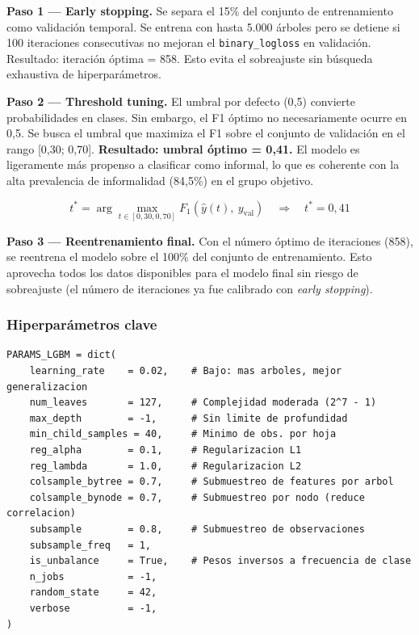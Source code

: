 \documentclass[12pt, a4paper]{article}
\begin{document}
\textbf{Paso 1 — Early stopping.} Se separa el 15\% del conjunto de entrenamiento como
validación temporal. Se entrena con hasta 5.000 árboles pero se detiene si 100 iteraciones
consecutivas no mejoran el \texttt{binary\_logloss} en validación. Resultado: iteración
óptima = 858. Esto evita el sobreajuste sin búsqueda exhaustiva de hiperparámetros.

\textbf{Paso 2 — Threshold tuning.} El umbral por defecto (0{,}5) convierte probabilidades
en clases. Sin embargo, el F1 óptimo no necesariamente ocurre en 0{,}5. Se busca el umbral
que maximiza el F1 sobre el conjunto de validación en el rango [0{,}30; 0{,}70].
\textbf{Resultado: umbral óptimo = 0{,}41.} El modelo es ligeramente más propenso a
clasificar como informal, lo que es coherente con la alta prevalencia de informalidad
(84{,}5\%) en el grupo objetivo.

\begin{equation}
  t^* = \arg\max_{t \in [0{,}30, 0{,}70]}
        F_1\!\left(\hat{y}(t),\ y_\text{val}\right)
  \quad \Rightarrow \quad t^* = 0{,}41
\end{equation}

\textbf{Paso 3 — Reentrenamiento final.} Con el número óptimo de iteraciones (858),
se reentrena el modelo sobre el 100\% del conjunto de entrenamiento. Esto aprovecha
todos los datos disponibles para el modelo final sin riesgo de sobreajuste (el número
de iteraciones ya fue calibrado con \textit{early stopping}).

\subsubsection{Hiperparámetros clave}

\begin{lstlisting}[caption={Hiperparámetros LightGBM campeón}]
PARAMS_LGBM = dict(
    learning_rate    = 0.02,    # Bajo: mas arboles, mejor generalizacion
    num_leaves       = 127,     # Complejidad moderada (2^7 - 1)
    max_depth        = -1,      # Sin limite de profundidad
    min_child_samples = 40,     # Minimo de obs. por hoja
    reg_alpha        = 0.1,     # Regularizacion L1
    reg_lambda       = 1.0,     # Regularizacion L2
    colsample_bytree = 0.7,     # Submuestreo de features por arbol
    colsample_bynode = 0.7,     # Submuestreo por nodo (reduce correlacion)
    subsample        = 0.8,     # Submuestreo de observaciones
    subsample_freq   = 1,
    is_unbalance     = True,    # Pesos inversos a frecuencia de clase
    n_jobs           = -1,
    random_state     = 42,
    verbose          = -1,
)
\end{lstlisting}
\end{document}
